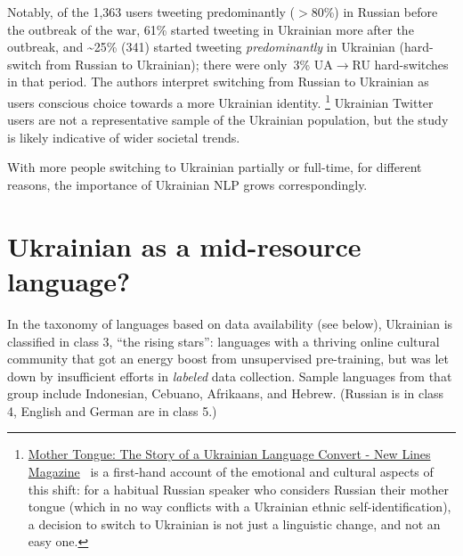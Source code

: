 Notably, of the 1,363 users tweeting predominantly ($>80$\%) in
Russian before the outbreak of the war, 61\% started tweeting in Ukrainian more
after the outbreak, and \textasciitilde25\% (341) started tweeting
\emph{predominantly} in Ukrainian (hard-switch from
Russian to Ukrainian); there were only~3\% UA$\rightarrow$RU hard-switches 
in that period.
The authors interpret switching from Russian to Ukrainian as users\textquotesingle{} conscious
choice towards a more Ukrainian identity.%
\footnote{
  \href{https://newlinesmag.com/first-person/mother-tongue-the-story-of-a-ukrainian-language-convert/}{Mother
  Tongue: The Story of a Ukrainian Language Convert - New Lines
  Magazine}~\cite{newlinesmagMotherTongue} is a first-hand account of the emotional and cultural aspects of this shift: for a habitual Russian speaker who considers Russian their mother tongue (which in no way conflicts with a Ukrainian ethnic self-identification), a decision to switch to Ukrainian is not just a linguistic change, and not an easy one. 
}
Ukrainian Twitter users are not a representative sample of the Ukrainian
population, but the study is likely indicative of
wider societal trends.

With more people switching to Ukrainian partially or full-time, for
different reasons, the importance of Ukrainian NLP grows
correspondingly.

\section{Ukrainian as a mid-resource
language?}\label{ukrainian-as-a-mid-resource-language}

In the taxonomy of languages based on data availability \cite{inclusion}
(see below), Ukrainian is classified in class 3, ``the rising stars'':
languages with a thriving online cultural community that got an energy
boost from unsupervised pre-training, but was let down by insufficient
efforts in \emph{labeled} data collection. Sample languages from that
group include Indonesian, Cebuano, Afrikaans, and Hebrew. (Russian is in
class 4, English and German are in class 5.)

